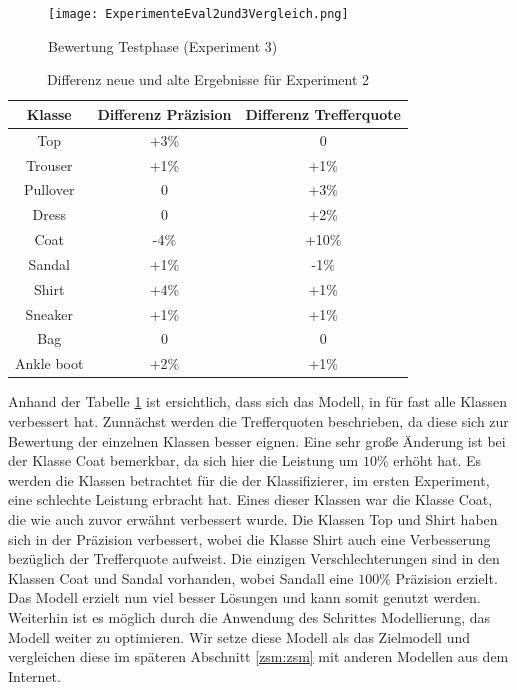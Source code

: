\documentclass[12pt]{scrreprt}
\begin{document}
\begin{figure}[h!]
	\centering
	\texttt{[image: ExperimenteEval2und3Vergleich.png]}
	\caption{ Bewertung Testphase \cite{HK22}(Experiment 3)}
	\label{fig:fig20}
\end{figure}

\newpage
\begin{table}[h!]
	\begin{center}
		\begin{tabular}{|c|c|c|}
			\hline
			Klasse & Differenz Präzision & Differenz Trefferquote \\
			\hline
			Top  & +3\% & 0\\
			\hline
			Trouser  & +1\% & +1\%  \\
			\hline
			Pullover   & 0 & +3\% \\
			\hline
			Dress   & 0 & +2\% \\
			\hline
			Coat   & -4\% & +10\% \\
			\hline
			Sandal & +1\% & -1\% \\
			\hline
			Shirt & +4\% & +1\% \\
			\hline
			Sneaker & +1\% & +1\% \\
			\hline
			Bag & 0 & 0 \\
			\hline
			Ankle boot & +2\% & +1\% \\
			\hline
		\end{tabular}
		\caption{Differenz neue und alte Ergebnisse für Experiment 2}
		\label{tab:differenz2}
	\end{center}
\end{table}


Anhand der Tabelle \ref{tab:differenz2} ist ersichtlich, dass sich das Modell, in für fast alle Klassen verbessert hat. Zunnächst werden die Trefferquoten beschrieben, da diese sich zur Bewertung der einzelnen Klassen besser eignen. Eine sehr große Änderung ist bei der Klasse Coat bemerkbar, da sich hier die Leistung um $10\%$ erhöht hat. Es werden die Klassen betrachtet für die der Klassifizierer, im ersten Experiment, eine schlechte Leistung erbracht hat. Eines dieser Klassen war die Klasse Coat, die wie auch zuvor erwähnt verbessert wurde. Die Klassen Top und Shirt haben sich in der Präzision verbessert, wobei die Klasse Shirt auch eine Verbesserung bezüglich der Trefferquote aufweist. Die einzigen Verschlechterungen sind in den Klassen Coat und Sandal vorhanden, wobei Sandall eine $100\%$ Präzision erzielt. Das Modell erzielt nun viel besser Lösungen und kann somit genutzt werden. Weiterhin ist es möglich durch die Anwendung des Schrittes Modellierung, das Modell weiter zu optimieren. Wir setze diese Modell als das Zielmodell und vergleichen diese im späteren Abschnitt \ref{zsm:zsm} mit anderen Modellen aus dem Internet.
\end{document}
